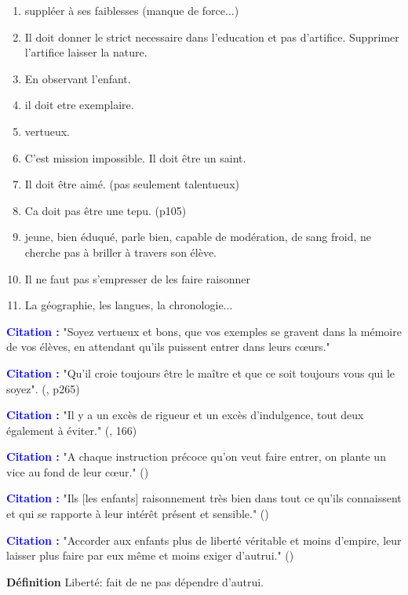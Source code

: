 \documentclass[a4paper, 11pt, hidelinks]{article}
\newcommand{\de}{\large \textbf{Définition} \large }
\newcommand{\cit}{\large \textcolor{blue}{\textbf{Citation :}} \large }
\newcommand{\rb}[1]{\Romanbar{#1}}
\begin{document}
\begin{enumerate}
    \item suppléer à ses faiblesses (manque de force...)
    \item Il doit donner le strict necessaire dans l'education et pas d'artifice. Supprimer l'artifice laisser la nature. 
    \item En observant l'enfant.
    \item il doit etre exemplaire.
    \item vertueux.
    \item C'est mission impossible. Il doit être un saint.
    \item Il doit être aimé. (pas seulement talentueux)
    \item Ca doit pas être une tepu. (p105)
    \item jeune, bien éduqué, parle bien, capable de modération, de sang froid, ne cherche pas à briller à travers son élève.
    \item Il ne faut pas s'empresser de les faire raisonner
    \item La géographie, les langues, la chronologie...
\end{enumerate}


\cit "Soyez vertueux et bons, que vos exemples se gravent dans la mémoire de vos élèves, en attendant qu'ils puissent
entrer dans leurs c\oe urs."

\cit "Qu'il croie toujours être le maître et que ce soit toujours vous qui le soyez". (\rb{2}, p265)


\cit "Il y a un excès de rigueur et un excès d'indulgence, tout deux également à éviter." (\rb{2}, 166)


\cit "A chaque instruction précoce qu'on veut faire entrer, on plante un vice au fond de leur c\oe ur." (\rb{2})


\cit "Ils [les enfants] raisonnement très bien dans tout ce qu'ils connaissent et qui se rapporte à leur intérêt présent et sensible." (\rb{2})


\cit "Accorder aux enfants plus de liberté véritable et moins d'empire, leur laisser plus faire par eux même et moins exiger d'autrui." (\rb{1})


\de Liberté: fait de ne pas dépendre d'autrui.
\end{document}

